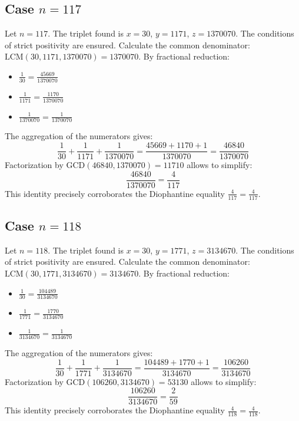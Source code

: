 \documentclass[11pt,a4paper]{article}
\begin{document}
\subsection{Case $n = 117$}
Let $n = 117$. The triplet found is $x = 30$, $y = 1171$, $z = 1370070$.
The conditions of strict positivity are ensured.
Calculate the common denominator: $\text{LCM}(30, 1171, 1370070) = 1370070$.
By fractional reduction:
\begin{itemize}
    \item $\frac{1}{30} = \frac{45669}{1370070}$
    \item $\frac{1}{1171} = \frac{1170}{1370070}$
    \item $\frac{1}{1370070} = \frac{1}{1370070}$
\end{itemize}
The aggregation of the numerators gives:
$$ \frac{1}{30} + \frac{1}{1171} + \frac{1}{1370070} = \frac{45669 + 1170 + 1}{1370070} = \frac{46840}{1370070} $$
Factorization by $\text{GCD}(46840, 1370070) = 11710$ allows to simplify:
$$ \frac{46840}{1370070} = \frac{4}{117} $$
This identity precisely corroborates the Diophantine equality $\frac{4}{117} = \frac{4}{117}$.

\subsection{Case $n = 118$}
Let $n = 118$. The triplet found is $x = 30$, $y = 1771$, $z = 3134670$.
The conditions of strict positivity are ensured.
Calculate the common denominator: $\text{LCM}(30, 1771, 3134670) = 3134670$.
By fractional reduction:
\begin{itemize}
    \item $\frac{1}{30} = \frac{104489}{3134670}$
    \item $\frac{1}{1771} = \frac{1770}{3134670}$
    \item $\frac{1}{3134670} = \frac{1}{3134670}$
\end{itemize}
The aggregation of the numerators gives:
$$ \frac{1}{30} + \frac{1}{1771} + \frac{1}{3134670} = \frac{104489 + 1770 + 1}{3134670} = \frac{106260}{3134670} $$
Factorization by $\text{GCD}(106260, 3134670) = 53130$ allows to simplify:
$$ \frac{106260}{3134670} = \frac{2}{59} $$
This identity precisely corroborates the Diophantine equality $\frac{4}{118} = \frac{4}{118}$.
\end{document}
